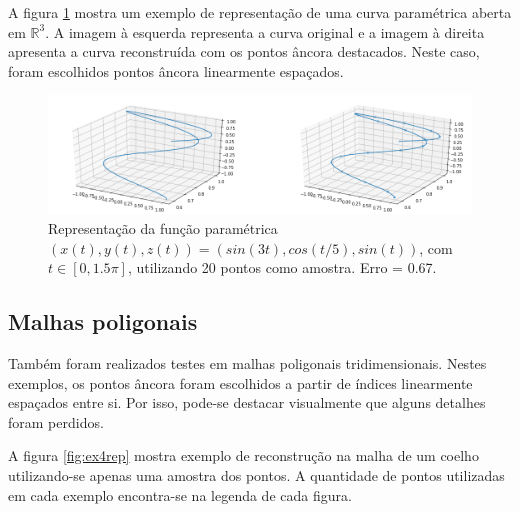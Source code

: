 A figura \ref{fig:c3d1} mostra um exemplo de representação de uma curva paramétrica aberta em $\mathbb{R}^3$. A imagem à esquerda representa a curva original e a imagem à direita apresenta a curva reconstruída com os pontos âncora destacados. Neste caso, foram escolhidos pontos âncora linearmente espaçados.

\begin{figure}[H]
	\centering
	\includegraphics[width=1\textwidth]{img/res/open3d.png}
	\caption{Representação da função paramétrica $(x(t), y(t), z(t)) = (sin(3t), cos(t/5), sin(t))$, com $t \in [0, 1.5\pi]$, utilizando 20 pontos como amostra. Erro = 0.67.}
	\label{fig:c3d1}
\end{figure}

\subsection{Malhas poligonais}

Também foram realizados testes em malhas poligonais tridimensionais. Nestes exemplos, os pontos âncora foram escolhidos a partir de índices linearmente espaçados entre si. Por isso, pode-se destacar visualmente que alguns detalhes foram perdidos.

A figura \ref{fig:ex4rep} mostra exemplo de reconstrução na malha de um coelho utilizando-se apenas uma amostra dos pontos. A quantidade de pontos utilizadas em cada exemplo encontra-se na legenda de cada figura.

